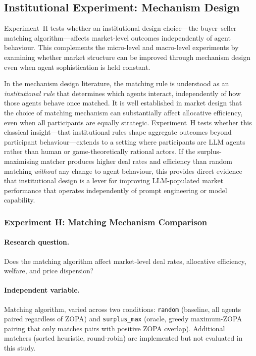 
\subsection{Institutional Experiment: Mechanism Design}
\label{sec:exp-institutional}

Experiment~H tests whether an institutional design choice---the buyer--seller matching algorithm---affects market-level outcomes independently of agent behaviour.  This complements the micro-level and macro-level experiments by examining whether market structure can be improved through mechanism design even when agent sophistication is held constant.

In the mechanism design literature, the matching rule is understood as an \emph{institutional rule} that determines which agents interact, independently of how those agents behave once matched.  It is well established in market design that the choice of matching mechanism can substantially affect allocative efficiency, even when all participants are equally strategic.  Experiment~H tests whether this classical insight---that institutional rules shape aggregate outcomes beyond participant behaviour---extends to a setting where participants are LLM agents rather than human or game-theoretically rational actors.  If the surplus-maximising matcher produces higher deal rates and efficiency than random matching \emph{without} any change to agent behaviour, this provides direct evidence that institutional design is a lever for improving LLM-populated market performance that operates independently of prompt engineering or model capability.

\subsubsection{Experiment H: Matching Mechanism Comparison}
\label{sec:exp-mechanism}

\paragraph{Research question.}
Does the matching algorithm affect market-level deal rates, allocative efficiency, welfare, and price dispersion?

\paragraph{Independent variable.}
Matching algorithm, varied across two conditions: \texttt{random} (baseline, all agents paired regardless of ZOPA) and \texttt{surplus\_max} (oracle, greedy maximum-ZOPA pairing that only matches pairs with positive ZOPA overlap).  Additional matchers (sorted heuristic, round-robin) are implemented but not evaluated in this study.

